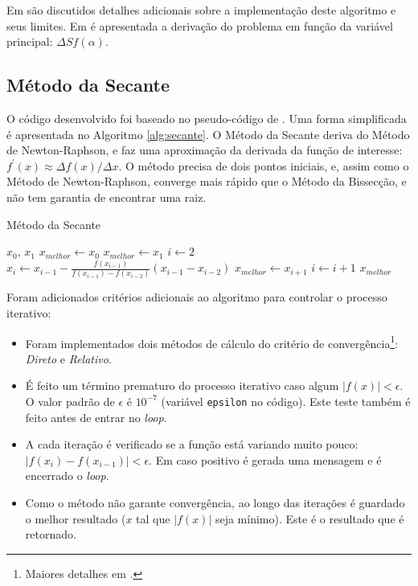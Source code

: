 \documentclass[final,5p]{elsarticle}
\numberwithin{equation}{section}
\begin{document}
Em \cite{relatoriobisseccao} são discutidos detalhes adicionais sobre a implementação deste algoritmo e seus limites. Em \cite{relatorionewtonraphson} é apresentada a derivação do problema em função da variável principal: $\Delta S f(\alpha)$.

    \subsection{Método da Secante}

    O código desenvolvido foi baseado no pseudo-código de \cite{burden2016analise}. Uma forma simplificada é apresentada no Algoritmo \ref{alg:secante}. O Método da Secante deriva do Método de Newton-Raphson, e faz uma aproximação da derivada da função de interesse: $f^{\prime}(x) \approx \Delta f(x) / \Delta x$. O método precisa de dois pontos iniciais, e, assim como o Método de Newton-Raphson, converge mais rápido que o Método da Bissecção, e não tem garantia de encontrar uma raiz.

    \begin{algorithm}
        \caption{Método da Secante}\label{alg:secante}
        \begin{algorithmic}
            \Require $x_0$, $x_1$
                \State $x_{melhor} \gets x_0$
            \Else
                \State $x_{melhor} \gets x_1$
            \EndIf
            \State $i \gets 2$
            \Repeat
                \State $x_{i} \gets x_{i-1} - \frac{f(x_{i-1})}{f(x_{i-1})-f(x_{i-2})}(x_{i-1}-x_{i-2})$
                    \State $x_{melhor} \gets x_{i+1}$
                \EndIf
                \State $i \gets i+1$
            \State \Return $x_{melhor}$
        \end{algorithmic}
    \end{algorithm}

    Foram adicionados critérios adicionais ao algoritmo para controlar o processo iterativo:

    \begin{itemize}
        \item Foram implementados dois métodos de cálculo do critério de convergência\footnote{Maiores detalhes em \cite{relatoriobisseccao}.}: \emph{Direto} e \emph{Relativo}.
        \item É feito um término prematuro do processo iterativo caso algum $|f(x)| < \epsilon$. O valor padrão de $\epsilon$ é $10^{-7}$ (variável \verb|epsilon| no código). Este teste também é feito antes de entrar no \emph{loop}.
        \item A cada iteração é verificado se a função está variando muito pouco: $|f(x_i)-f(x_{i-1})| < \epsilon$. Em caso positivo é gerada uma mensagem e é encerrado o \emph{loop}.
        \item Como o método não garante convergência, ao longo das iterações é guardado o melhor resultado ($x$ tal que $|f(x)|$ seja mínimo). Este é o resultado que é retornado.
    \end{itemize}
\end{document}
